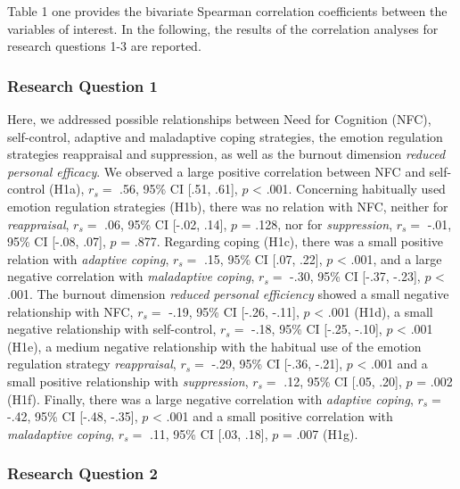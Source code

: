 \documentclass[
  man]{apa6}
\begin{document}
Table 1 one provides the bivariate Spearman correlation coefficients between the variables of interest. In the following, the results of the correlation analyses for research questions 1-3 are reported.

\subsubsection{Research Question 1}\label{research-question-1}

Here, we addressed possible relationships between Need for Cognition (NFC), self-control, adaptive and maladaptive coping strategies, the emotion regulation strategies reappraisal and suppression, as well as the burnout dimension \emph{reduced personal efficacy}. We observed a large positive correlation between NFC and self-control (H1a), \(r_{s}=\) .56, 95\% CI {[}.51, .61{]}, \(p\) \textless{} .001. Concerning habitually used emotion regulation strategies (H1b), there was no relation with NFC, neither for \emph{reappraisal}, \(r_{s}=\) .06, 95\% CI {[}-.02, .14{]}, \(p\) = .128, nor for \emph{suppression}, \(r_{s}=\) -.01, 95\% CI {[}-.08, .07{]}, \(p\) = .877. Regarding coping (H1c), there was a small positive relation with \emph{adaptive coping}, \(r_{s}=\) .15, 95\% CI {[}.07, .22{]}, \(p\) \textless{} .001, and a large negative correlation with \emph{maladaptive coping}, \(r_{s}=\) -.30, 95\% CI {[}-.37, -.23{]}, \(p\) \textless{} .001. The burnout dimension \emph{reduced personal efficiency} showed a small negative relationship with NFC, \(r_{s}=\) -.19, 95\% CI {[}-.26, -.11{]}, \(p\) \textless{} .001 (H1d), a small negative relationship with self-control, \(r_{s}=\) -.18, 95\% CI {[}-.25, -.10{]}, \(p\) \textless{} .001 (H1e), a medium negative relationship with the habitual use of the emotion regulation strategy \emph{reappraisal}, \(r_{s}=\) -.29, 95\% CI {[}-.36, -.21{]}, \(p\) \textless{} .001 and a small positive relationship with \emph{suppression}, \(r_{s}=\) .12, 95\% CI {[}.05, .20{]}, \(p\) = .002 (H1f). Finally, there was a large negative correlation with \emph{adaptive coping}, \(r_{s}=\) -.42, 95\% CI {[}-.48, -.35{]}, \(p\) \textless{} .001 and a small positive correlation with \emph{maladaptive coping}, \(r_{s}=\) .11, 95\% CI {[}.03, .18{]}, \(p\) = .007 (H1g).

\subsubsection{Research Question 2}\label{research-question-2}
\end{document}
